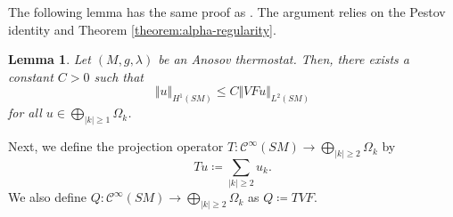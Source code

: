 \documentclass[reqno,12pt,letterpaper]{amsart}
\newtheorem{lemma}[proposition]{Lemma}
\theoremstyle{definition}
\theoremstyle{remark}
\theoremstyle{definition}
\numberwithin{equation}{section}
\begin{document}
The following lemma has the same proof as \cite[Lemma 4.1]{assylbekov17}. The argument relies on the Pestov identity and Theorem \ref{theorem:alpha-regularity}.
\begin{lemma}\label{lemma:hanming-lemma}
Let $(M, g, \lambda)$ be an Anosov thermostat. Then, there exists a constant $C>0$ such that
$$\Vert u \Vert_{H^1(SM)}\leq C\Vert VFu\Vert_{L^2(SM)}$$
for all $u\in \bigoplus_{|k|\geq 1}\Omega_k$.
\end{lemma}

Next, we define the projection operator $T:\mathcal{C}^\infty(SM)\to \bigoplus_{|k|\geq 2}\Omega_k$ by
\begin{equation}\label{eq:defn-T}
 Tu\coloneqq \sum_{|k|\geq 2}u_k.
\end{equation}
We also define $Q:\mathcal{C}^\infty(SM)\to \bigoplus_{|k|\geq 2}\Omega_k$ as $Q\coloneqq TVF$. 
\end{document}
